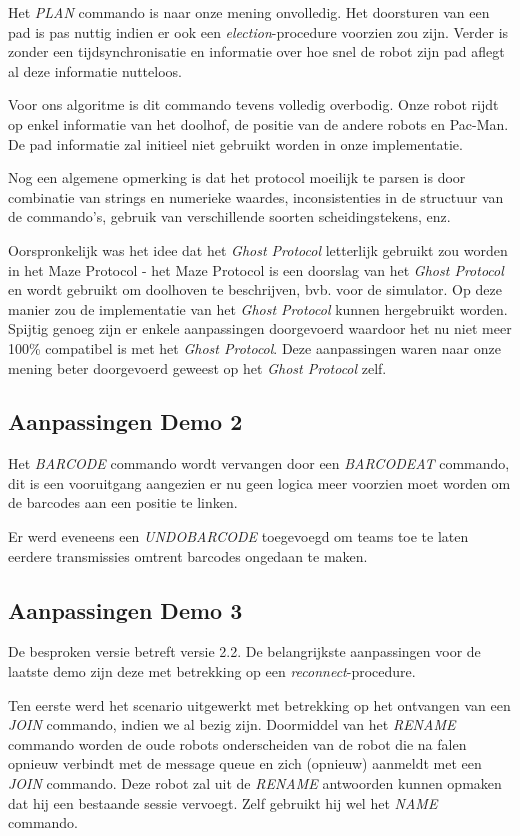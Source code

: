 \documentclass[12pt,a4paper]{report}
\begin{document}
Het \emph{PLAN} commando is naar onze mening onvolledig. Het doorsturen van een pad is pas nuttig indien er ook een \emph{election}-procedure voorzien zou zijn. Verder is zonder een tijdsynchronisatie en informatie over hoe snel de robot zijn pad aflegt al deze informatie nutteloos.

Voor ons algoritme is dit commando tevens volledig overbodig. Onze robot rijdt op enkel informatie van het doolhof, de positie van de andere robots en Pac-Man. De pad informatie zal initieel niet gebruikt worden in onze implementatie.

Nog een algemene opmerking is dat het protocol moeilijk te parsen is door combinatie van strings en numerieke waardes, inconsistenties in de structuur van de commando's, gebruik van verschillende soorten scheidingstekens, enz.

Oorspronkelijk was het idee dat het \emph{Ghost Protocol} letterlijk gebruikt zou worden in het Maze Protocol - het Maze Protocol is een doorslag van het \emph{Ghost Protocol} en wordt gebruikt om doolhoven te beschrijven, bvb. voor de simulator. Op deze manier zou de implementatie van het \emph{Ghost Protocol} kunnen hergebruikt worden. Spijtig genoeg zijn er enkele aanpassingen doorgevoerd waardoor het nu niet meer 100\% compatibel is met het \emph{Ghost Protocol}. Deze aanpassingen waren naar onze mening beter doorgevoerd geweest op het \emph{Ghost Protocol} zelf.

\subsection{Aanpassingen Demo 2}

Het \emph{BARCODE} commando wordt vervangen door een \emph{BARCODEAT} commando, dit is een vooruitgang aangezien er nu geen logica meer voorzien moet worden om de barcodes aan een positie te linken. 

Er werd eveneens een \emph{UNDOBARCODE} toegevoegd om teams toe te laten eerdere transmissies omtrent barcodes ongedaan te maken.

\subsection{Aanpassingen Demo 3}

De besproken versie betreft versie 2.2. De belangrijkste aanpassingen voor de laatste demo zijn deze met betrekking op een \emph{reconnect}-procedure.

Ten eerste werd het scenario uitgewerkt met betrekking op het ontvangen van een \emph{JOIN} commando, indien we al bezig zijn. Doormiddel van het \emph{RENAME} commando worden de oude robots onderscheiden van de robot die na falen opnieuw verbindt met de message queue en zich (opnieuw) aanmeldt met een \emph{JOIN} commando. Deze robot zal uit de \emph{RENAME} antwoorden kunnen opmaken dat hij een bestaande sessie vervoegt. Zelf gebruikt hij wel het \emph{NAME} commando.
\end{document}
